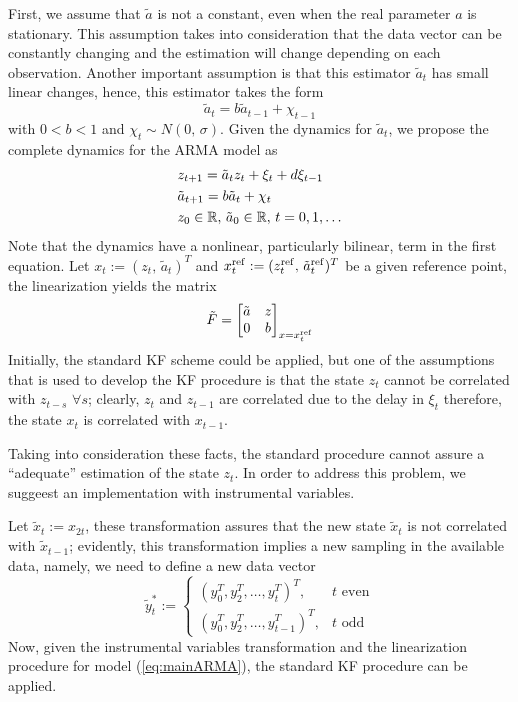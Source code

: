 First, we assume that $\tilde{a}$ is not a constant, even when the real parameter $a$ is stationary. This assumption takes into consideration that the data vector can be constantly changing and the estimation will change depending on each observation. Another important assumption is that this estimator $\tilde{a}_t$ has small linear changes, hence, this estimator takes the form
\begin{equation}
  \tilde{a}_t=b\tilde{a}_{t-1}+\chi_{t-1}
\end{equation}
with $0<b<1$ and $\chi_t \sim N(0,\,\sigma)$. Given the dynamics for $\tilde{a}_t$, we propose the complete dynamics for the ARMA model as
\begin{equation}\label{eq:mainARMA}
  \begin{split}
    &z_{t+1}=\tilde{a}_tz_t+\xi_t+d\xi_{t-1}\\
    &\tilde{a}_{t+1}=b\tilde{a}_t+\chi_t\\
    &z_0\in{\mathbb{R}},\,\tilde{a}_0\in{\mathbb{R}},\,t=0,1,\dots
  \end{split}
\end{equation}
Note that the dynamics have a nonlinear, particularly bilinear, term in the first equation. Let $x_t:=(z_t,\,\tilde{a}_t)^T$ and $x^{{\rm ref}}_t:=(z_t^{{\rm ref}},\,\tilde{a}_t^{{\rm ref}})^T$ be a given reference point, the linearization yields the matrix
\[
\tilde{F} = \begin{bmatrix}
\tilde{a} & z\\
0 & b
\end{bmatrix}_{x=x_t^{{\rm ref}}}
\]
Initially, the standard KF scheme could be applied, but one of the assumptions that is used to develop the KF procedure is that the state $z_t$ cannot be correlated with $z_{t-s}$ $\forall s$; clearly, $z_t$ and $z_{t-1}$ are correlated due to the delay in $\xi_t$ therefore, the state $x_t$ is correlated with $x_{t-1}$.

Taking into consideration these facts, the standard procedure cannot assure a ``adequate'' estimation of the state $z_t$. In order to address this problem, we suggeest an implementation with instrumental variables.

Let $\tilde{x}_t:=x_{2t}$, these transformation assures that the new state $\tilde{x}_t$ is not correlated with $\tilde{x}_{t-1}$; evidently, this transformation implies a new sampling in the available data, namely, we need to define a new data vector
 \[\tilde{y}_t^*:=\begin{cases}
   (y_0^T, y_2^T,\ldots,y_t^T)^T,&t\text{ even}\\
   (y_0^T, y_2^T,\ldots,y_{t-1}^T)^T,&t\text{ odd}
 \end{cases}\]
Now, given the instrumental variables transformation and the linearization procedure for model (\ref{eq:mainARMA}), the standard KF procedure can be applied.
